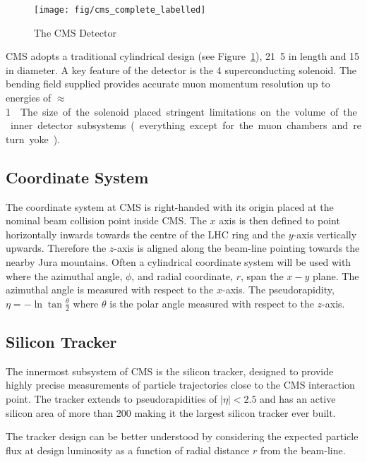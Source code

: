 \begin{figure}
\centering
\texttt{[image: fig/cms\_complete\_labelled]}
\caption{The CMS Detector}
\label{fig:expt_cms}
\end{figure}

\ac{CMS} adopts a traditional cylindrical design (see
Figure~\ref{fig:expt_cms}), \unit{21.5}{\metre} in length and \unit{15}{\metre}
in diameter. A key feature of the detector is the \unit{4}{\tesla}
superconducting solenoid. The bending field supplied provides accurate muon
momentum resolution up to energies of \unit{$\approx$ 1}{\TeV}. The size of the
solenoid placed stringent limitations on the volume of the inner detector
subsystems (everything except for the muon chambers and return yoke).

\subsection{Coordinate System}
The coordinate system at \ac{CMS} is right-handed with its origin placed at the
nominal beam collision point inside \ac{CMS}. The $x$ axis is then defined to
point horizontally inwards towards the centre of the \ac{LHC} ring and the
$y$-axis vertically upwards. Therefore the $z$-axis is aligned along the
beam-line pointing towards the nearby Jura mountains. Often a cylindrical
coordinate system will be used with where the azimuthal angle, $\phi$, and
radial coordinate, $r$, span the $x-y$ plane. The azimuthal angle is measured
with respect to the $x$-axis. The pseudorapidity, $\eta = - \ln \tan
\frac{\theta}{2}$ where $\theta$ is the polar angle measured with respect to the
$z$-axis.

\subsection{Silicon Tracker}
The innermost subsystem of \ac{CMS} is the silicon tracker, designed to provide
highly precise measurements of particle trajectories close to the CMS
interaction point. The tracker extends to pseudorapidities of $|\eta|<2.5$ and
has an active silicon area of more than \unit{200}{\metre\squared} making it the
largest silicon tracker ever built.

The tracker design can be better understood by considering the expected particle
flux at design luminosity as a function of radial distance $r$ from the
beam-line.

